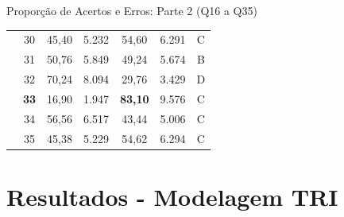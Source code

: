 \documentclass[10pt, aspectratio=169]{beamer}
\begin{document}
\begin{frame}{Proporção de Acertos e Erros: Parte 2 (Q16 a Q35)}
\begin{table}[H]
{\begin{tabular}{c|c|c|c|c|c|c}
               & 30          &  45,40             &  5.232   &  54,60           &  6.291   &  C    \\
               & 31          &  50,76             &  5.849   &  49,24           &  5.674   &  B    \\
               & 32          &  70,24             &  8.094   &  29,76           &  3.429   &  D    \\
               & \textbf{33} &  16,90             &  1.947   &  \textbf{83,10}  &   9.576  &  C    \\
               & 34          &  56,56             &  6.517   &  43,44           &   5.006  &  C    \\
               & 35          &  45,38             &  5.229   &  54,62           &   6.294  &  C    \\
          \hline \hline
        \end{tabular}}
    \end{table}
\end{frame}

\section{Resultados - Modelagem TRI}
\end{document}
